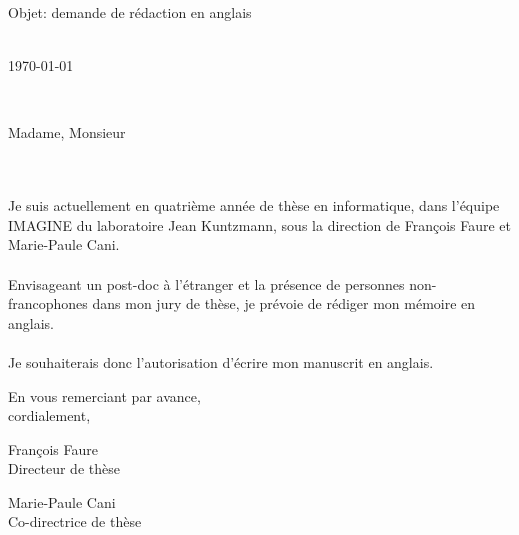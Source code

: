 \documentclass[11pt,a4paper]{letter} %
\def\opening#1{\thispagestyle{empty}
{\centering\fromaddress \vspace{1.0cm} \\ %
\vspace{2.5cm}
\hspace*{\longindentation}\today\hspace*{\fill}\par} %
\vspace{2cm}
{\raggedright \toname \\ \toaddress \par} %
\vspace{1.5cm}
\noindent #1 %
}
\begin{document}

\begin{letter}
{Objet: demande de rédaction en anglais}


\opening{Madame, Monsieur}
\\\\
\indent Je suis actuellement en quatrième année de thèse en informatique, dans l'équipe IMAGINE du laboratoire Jean Kuntzmann, sous la direction de François Faure et Marie-Paule Cani.
\\\\
\indent Envisageant un post-doc à l'étranger et la présence de personnes non-francophones dans mon jury de thèse, je prévoie de rédiger mon mémoire en anglais.
\\\\
\indent Je souhaiterais donc l'autorisation d'écrire mon manuscrit en anglais.

\closing{En vous remerciant par avance, \\ cordialement,}

\vspace{2cm}
\parbox[b][1cm][c]{5cm}{\centering François Faure \\ Directeur de thèse}
\parbox[b][1cm][c]{5cm}{\centering Marie-Paule Cani\\ Co-directrice de thèse}


\end{letter}
\end{document}
